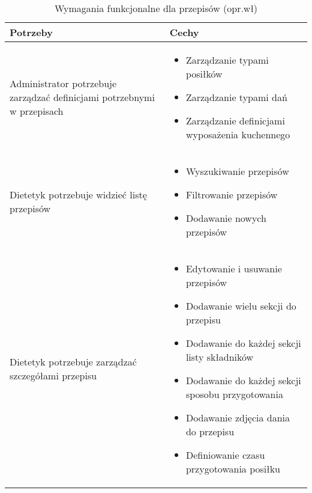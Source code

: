 \begin{minipage}{\textwidth}
    \begin{table}[H]
        \centering\caption{Wymagania funkcjonalne dla przepisów (opr.wł)\label{tabela:wymaganiaFunkcjonalnePrzepisy}}
        \begin{tabular}{|p{}|p{}|}
            \hline
            Potrzeby & Cechy \\

            \hline
            Administrator potrzebuje zarządzać definicjami potrzebnymi w przepisach &
            \begin{itemize}
                \item Zarządzanie typami posiłków
                \item Zarządzanie typami dań
                \item Zarządzanie definicjami wyposażenia kuchennego
            \end{itemize} \\
            \hline
            Dietetyk potrzebuje widzieć listę przepisów &
            \begin{itemize}
                \item Wyszukiwanie przepisów
                \item Filtrowanie przepisów
                \item Dodawanie nowych przepisów
            \end{itemize} \\
            \hline
            Dietetyk potrzebuje zarządzać szczegółami przepisu &
            \begin{itemize}
                \item Edytowanie i usuwanie przepisów
                \item Dodawanie wielu sekcji do przepisu
                \item Dodawanie do każdej sekcji listy składników
                \item Dodawanie do każdej sekcji sposobu przygotowania
                \item Dodawanie zdjęcia dania do przepisu
                \item Definiowanie czasu przygotowania posiłku
            \end{itemize} \\
            \hline
        \end{tabular}
    \end{table}
\end{minipage}

